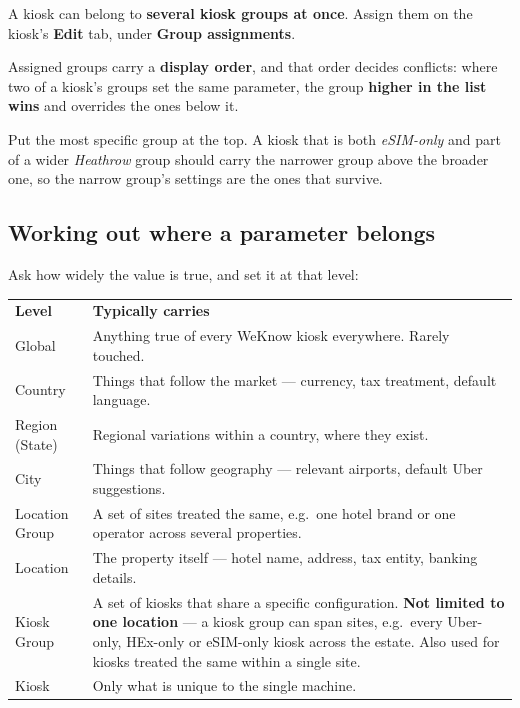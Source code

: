 \documentclass[a4paper,10pt]{article}
\begin{document}
A kiosk can belong to \textbf{several kiosk groups at once}. Assign them
on the kiosk's \textbf{Edit} tab, under \textbf{Group assignments}.

Assigned groups carry a \textbf{display order}, and that order decides
conflicts: where two of a kiosk's groups set the same parameter, the group
\textbf{higher in the list wins} and overrides the ones below it.

\begin{wkinfo}
Put the most specific group at the top. A kiosk that is both
\emph{eSIM-only} and part of a wider \emph{Heathrow} group should carry
the narrower group above the broader one, so the narrow group's settings
are the ones that survive.
\end{wkinfo}

\subsection{Working out where a parameter belongs}

Ask how widely the value is true, and set it at that level:

\begin{center}
\renewcommand{\arraystretch}{1.35}\small
\begin{tabularx}{\textwidth}{L{34mm} X}
\color{white}\textbf{Level} &
\color{white}\textbf{Typically carries}\\
Global &
Anything true of every WeKnow kiosk everywhere. Rarely touched.\\
Country &
Things that follow the market --- currency, tax treatment, default
language.\\
Region (State) &
Regional variations within a country, where they exist.\\
City &
Things that follow geography --- relevant airports, default Uber
suggestions.\\
Location Group &
A set of sites treated the same, e.g.\ one hotel brand or one operator
across several properties.\\
Location &
The property itself --- hotel name, address, tax entity, banking details.\\
Kiosk Group &
A set of kiosks that share a specific configuration. \textbf{Not limited
to one location} --- a kiosk group can span sites, e.g.\ every Uber-only,
HEx-only or eSIM-only kiosk across the estate. Also used for kiosks
treated the same within a single site.\\
Kiosk &
Only what is unique to the single machine.\\
\end{tabularx}
\end{center}
\end{document}
